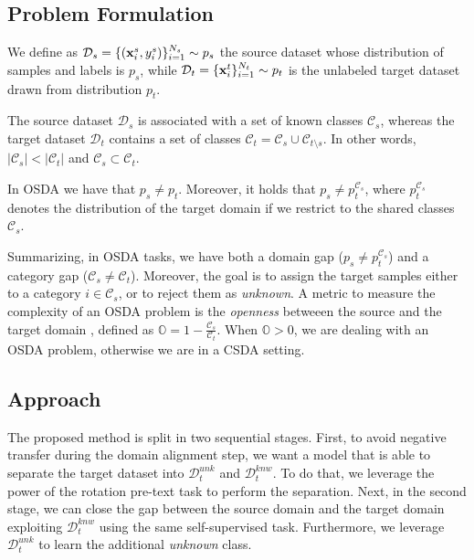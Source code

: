 \documentclass[10pt,twocolumn,letterpaper]{article}
\begin{document}
\subsection{Problem Formulation}
\label{sec:problemformulation}
We define as $\mathcal{D}_s = \{({\bf x}_i^s, y_i^s)\}_{i=1}^{N_s} \sim p_s$ the source dataset whose distribution of samples and labels is $p_s$,
while $\mathcal{D}_t = \{{\bf x}_i^t\}_{i=1}^{N_t} \sim p_t$ is the unlabeled target dataset drawn from distribution $p_t$. 

The source dataset $\mathcal{D}_s$ is associated with a set of known classes $\mathcal{C}_s$,
whereas the target dataset $\mathcal{D}_t$ contains a set of classes $\mathcal{C}_t = \mathcal{C}_s \cup \mathcal{C}_{t \setminus s}$.
In other words,
$|\mathcal{C}_s| < |\mathcal{C}_t|$ and $\mathcal{C}_s \subset \mathcal{C}_t$. 

In OSDA we have that $p_s \neq p_t$.
Moreover, it holds that $p_s \neq p_t^{\mathcal{C}_s}$, where $p_t^{\mathcal{C}_s}$ denotes the distribution of the target domain if we restrict to
the shared classes $\mathcal{C}_s$. 

Summarizing, in OSDA tasks, we have both a domain gap ($p_s \neq p_t^{\mathcal{C}_s}$)
and a category gap ($\mathcal{C}_s \neq \mathcal{C}_t$). Moreover, the goal is to assign the target samples either to a category ${i \in \mathcal{C}_s}$,
or to reject them as {\it unknown}.
A metric to measure the complexity of an OSDA problem is the {\it openness} betweeen the source and the target domain \cite{bendale2015open}, 
defined as $\displaystyle \mathbb{O} = 1-\frac{\mathcal{C}_s}{\mathcal{C}_t}$.
When $\mathbb{O} > 0$, we are dealing with an OSDA problem, otherwise we are in a CSDA setting.

\subsection{Approach}
\label{sec:apporach}
The proposed method is split in two sequential stages. First, to avoid negative transfer during the domain alignment step, we want a model
that is able to separate the target dataset into $\mathcal{D}_t^{unk}$ and $\mathcal{D}_t^{knw}$. To do that, we leverage the
power of the rotation pre-text task to perform the separation.
Next, in the second stage, we can close the gap between the source domain and the target domain exploiting $\mathcal{D}_t^{knw}$
using the same self-supervised task. Furthermore, we leverage $\mathcal{D}_t^{unk}$ to learn the additional {\it unknown} class.
\end{document}
